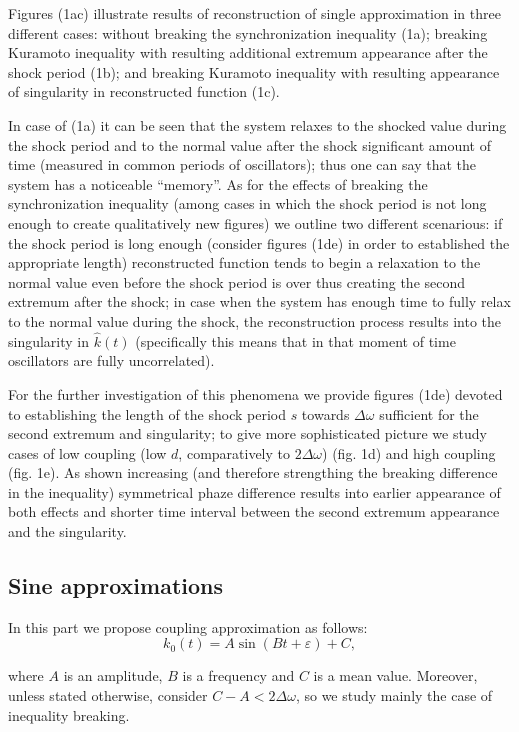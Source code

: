 \documentclass{ws-ijbc}
\begin{document}
Figures (1a\textendash c) illustrate results of reconstruction of
single approximation in three different cases: without breaking the
synchronization inequality (1a); breaking Kuramoto inequality with
resulting additional extremum appearance after the shock period (1b);
and breaking Kuramoto inequality with resulting appearance of singularity
in reconstructed function (1c). 

In case of (1a) it can be seen that the system relaxes to the shocked
value during the shock period and to the normal value after the shock
significant amount of time (measured in common periods of oscillators);
thus one can say that the system has a noticeable ``memory''. As
for the effects of breaking the synchronization inequality (among
cases in which the shock period is not long enough to create qualitatively
new figures) we outline two different scenarious: if the shock period
is long enough (consider figures (1d\textendash e) in order to established
the appropriate length) reconstructed function tends to begin a relaxation
to the normal value even before the shock period is over thus creating
the second extremum after the shock; in case when the system has enough
time to fully relax to the normal value during the shock, the reconstruction
process results into the singularity in $\hat{k}(t)$ (specifically
this means that in that moment of time oscillators are fully uncorrelated). 

For the further investigation of this phenomena we provide figures
(1d\textendash e) devoted to establishing the length of the shock
period $s$ towards $\Delta\omega$ sufficient for the second extremum
and singularity; to give more sophisticated picture we study cases
of low coupling (low $d$, comparatively to $2\Delta\omega$) (fig.
1d) and high coupling (fig. 1e). As shown increasing (and therefore
strengthing the breaking difference in the inequality) symmetrical
phaze difference results into earlier appearance of both effects and
shorter time interval between the second extremum appearance and the
singularity.

\subsection{Sine approximations}

In this part we propose coupling approximation as follows:
\[
k_{0}(t)=A\sin\left(Bt+\varepsilon\right)+C,
\]

where $A$ is an amplitude, $B$ is a frequency and $C$ is a mean
value. Moreover, unless stated otherwise, consider $C-A<2\Delta\omega$,
so we study mainly the case of inequality breaking.
\end{document}
